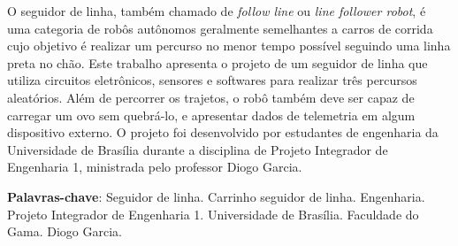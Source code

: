 \setlength{\absparsep}{18pt}
\begin{resumo}
  O seguidor de linha, também chamado de \textit{follow line} ou
  \textit{line follower robot}, é uma categoria de robôs autônomos geralmente
  semelhantes a carros de corrida cujo objetivo é realizar um percurso no menor
  tempo possível seguindo uma linha preta no chão. Este trabalho apresenta o
  projeto de um seguidor de linha que utiliza circuitos eletrônicos, sensores e
  softwares para realizar três percursos aleatórios. Além de percorrer os
  trajetos, o robô também deve ser capaz de carregar um ovo sem quebrá-lo, e
  apresentar dados de telemetria em algum dispositivo externo. O projeto
  foi desenvolvido por estudantes de engenharia da Universidade de Brasília
  durante a disciplina de Projeto Integrador de Engenharia 1, ministrada pelo
  professor Diogo Garcia.

  \textbf{Palavras-chave}:
    Seguidor de linha. Carrinho seguidor de linha. Engenharia. Projeto
    Integrador de Engenharia 1. Universidade de Brasília. Faculdade do Gama.
    Diogo Garcia.
\end{resumo}
